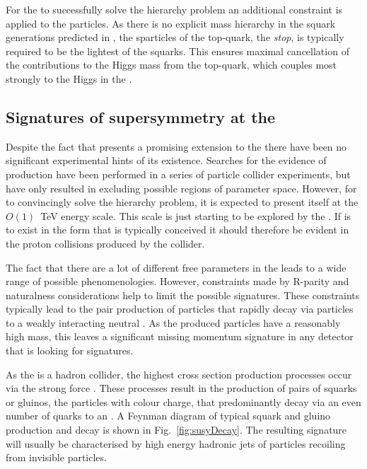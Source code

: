 For the \MSSM to successfully solve the hierarchy problem an
additional constraint is applied to the \SUSY particles. As there is
no explicit mass hierarchy in the squark generations predicted in
\SUSY, the sparticles of the top-quark, the \emph{stop}, is typically
required to be the lightest of the squarks. This ensures maximal
cancellation of the contributions to the Higgs mass from the
top-quark, which couples most strongly to the Higgs in the \SM.

\subsection{Signatures of supersymmetry at the \LHC}

Despite the fact that \SUSY presents a promising extension to the \SM
there have been no significant experimental hints of its existence.
Searches for the evidence of \SUSY production have been performed in a
series of particle collider experiments, but have only resulted in
excluding possible regions of \SUSY parameter space. However, for
\SUSY to convincingly solve the hierarchy problem, it is expected to
present itself at the $O(1)$~TeV energy scale. This scale is just
starting to be explored by the \LHC. If \SUSY is to exist in the form
that is typically conceived it should therefore be evident in the
proton collisions produced by the collider.

The fact that there are a lot of different free parameters in the
\MSSM leads to a wide range of possible \SUSY phenomenologies.
However, constraints made by R-parity and naturalness
considerations help to limit the possible signatures. These
constraints typically lead to the pair production of \SUSY particles
that rapidly decay via \SM particles to a weakly interacting neutral \LSP. 
As the produced \SUSY particles have a reasonably high mass, this
leaves a significant missing momentum signature in any detector that
is looking for \SUSY signatures.

As the \LHC is a hadron collider, the highest cross section \SUSY
production processes occur via the strong force \cite{Martin:1997ns}
\cite{SUSYxsections_NewAspectsof_pp_collisions}. These processes
result in the production of pairs of squarks or gluinos, the \SUSY
particles with colour charge, that predominantly decay via an even
number of \SM quarks to an \LSP. A Feynman diagram of typical squark
and gluino production and decay is shown in Fig.~\ref{fig:susyDecay}.
The resulting signature will usually be characterised by high energy
hadronic jets of \SM particles recoiling from invisible particles.

